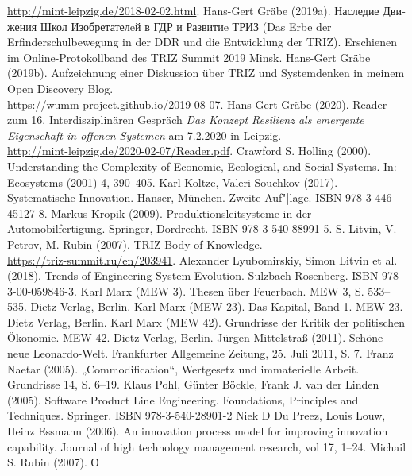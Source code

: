 \documentclass[12pt,a4paper]{article}
\begin{document}
\begin{thebibliography}{xxx}
  \url{http://mint-leipzig.de/2018-02-02.html}.
 Hans-Gert Gräbe (2019a).
  \foreignlanguage{russian}{Наследие Движения Школ Изобретателeй в ГДР и
    Развитиe ТРИЗ} (Das Erbe der Erfinderschulbewegung in der DDR und die
  Entwicklung der TRIZ). Erschienen im Online-Protokollband des TRIZ Summit
  2019 Minsk.
 Hans-Gert Gräbe (2019b).  Aufzeichnung einer Diskussion
  über TRIZ und Systemdenken in meinem Open Discovery Blog.\\
  \url{https://wumm-project.github.io/2019-08-07}.
 Hans-Gert Gräbe (2020). Reader zum 16. Interdisziplinären
  Gespräch \emph{Das Konzept Resilienz als emergente Eigenschaft in offenen
    Systemen} am 7.2.2020 in Leipzig.\\
  \url{http://mint-leipzig.de/2020-02-07/Reader.pdf}.
 Crawford S. Holling (2000). Understanding the Complexity
  of Economic, Ecological, and Social Systems. In: Ecosystems (2001) 4,
  390–405.
 Karl Koltze, Valeri Souchkov (2017).  Systematische
  Innovation. Hanser, München. Zweite Auf"|lage. ISBN 978-3-446-45127-8.
 Markus Kropik (2009). Produktionsleitsysteme in der
    Automobilfertigung. Springer, Dordrecht. ISBN 978-3-540-88991-5.
 S. Litvin, V. Petrov, M. Rubin (2007). TRIZ Body of
  Knowledge.\\ \url{https://triz-summit.ru/en/203941}.
 Alexander Lyubomirskiy, Simon Litvin et al. (2018). Trends
  of Engineering System Evolution. Sulzbach-Rosenberg.  ISBN
  978-3-00-059846-3.
 Karl Marx (MEW 3).  Thesen über Feuerbach. MEW 3, S. 533--535.
  Dietz Verlag, Berlin.
 Karl Marx (MEW 23). Das Kapital, Band 1. MEW 23. Dietz Verlag,
  Berlin.
 Karl Marx (MEW 42). Grundrisse der Kritik der politischen
  Ökonomie.  MEW 42. Dietz Verlag, Berlin.
 Jürgen Mittelstraß (2011).  Schöne neue
  Leonardo-Welt.  Frankfurter Allgemeine Zeitung, 25. Juli 2011, S. 7.
 Franz Naetar (2005). „Commodification“, Wertgesetz und
  immaterielle Arbeit. Grundrisse 14, S. 6--19.
 Klaus Pohl, Günter Böckle, Frank J. van der Linden (2005).
  Software Product Line Engineering. Foundations, Principles and Techniques.
  Springer. ISBN 978-3-540-28901-2
 Niek D Du Preez, Louis Louw, Heinz Essmann (2006). An
  innovation process model for improving innovation capability.  Journal of
  high technology management research, vol 17, 1--24.
 Michail S. Rubin (2007). \foreignlanguage{russian}{О
}
\end{thebibliography}
\end{document}
